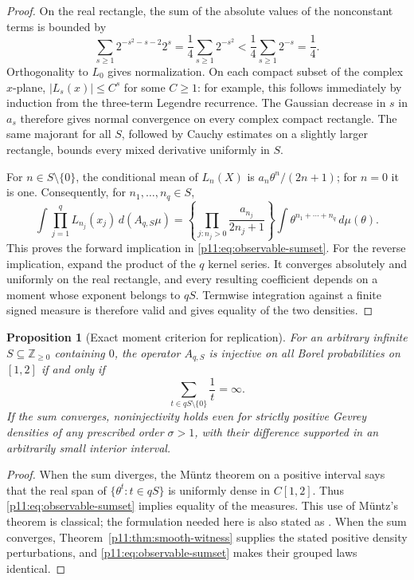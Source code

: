 \documentclass[11pt,letterpaper]{article}
\newtheorem{proposition}[theorem]{Proposition}
\theoremstyle{definition}
\theoremstyle{remark}
\newcommand{\1}{\mathbf 1}
\begin{document}
\begin{proof}
On the real rectangle, the sum of the absolute values of the
nonconstant terms is bounded by
\[
 \sum_{s\geq1}2^{-s^2-s-2}2^s
 =\frac14\sum_{s\geq1}2^{-s^2}
 <\frac14\sum_{s\geq1}2^{-s}=\frac14.
\]
Orthogonality to $L_0$ gives normalization.  On each compact subset of
the complex $x$-plane, $|L_s(x)|\leq C^s$ for some $C\geq1$: for example,
this follows immediately by induction from the three-term Legendre
recurrence.  The Gaussian decrease in $s$ in $a_s$ therefore gives
normal convergence on every complex compact rectangle.  The same
majorant for all $S$, followed by Cauchy estimates on a slightly larger
rectangle, bounds every mixed derivative uniformly in $S$.

For $n\in S\setminus\{0\}$, the conditional mean of $L_n(X)$ is
$a_n\theta^n/(2n+1)$; for $n=0$ it is one.  Consequently, for
$n_1,\ldots,n_q\in S$,
\begin{equation}\label{p11:eq:interval-product-statistic}
 \int\prod_{j=1}^q L_{n_j}(x_j)\,d(A_{q,S}\mu)
 =\left\{\prod_{j:n_j>0}\frac{a_{n_j}}{2n_j+1}\right\}
   \int\theta^{n_1+\cdots+n_q}\,d\mu(\theta).
\end{equation}
This proves the forward implication in \eqref{p11:eq:observable-sumset}.
For the reverse implication, expand the product of the $q$ kernel
series.  It converges absolutely and uniformly on the real rectangle,
and every resulting coefficient depends on a moment whose exponent
belongs to $qS$.  Termwise integration against a finite signed measure
is therefore valid and gives equality of the two densities.
\end{proof}

\begin{proposition}[Exact moment criterion for replication]
\label{p11:prop:interval-muntz}
For an arbitrary infinite $S\subseteq\mathbb Z_{\geq0}$ containing
$0$, the operator $A_{q,S}$ is injective on all Borel probabilities
on $[1,2]$ if and only if
\begin{equation}\label{p11:eq:replication-muntz}
 \sum_{t\in qS\setminus\{0\}}\frac1t=\infty.
\end{equation}
If the sum converges, noninjectivity holds even for strictly positive
Gevrey densities of any prescribed order $\sigma>1$, with their
difference supported in an arbitrarily small interior interval.
\end{proposition}
\begin{proof}
When the sum diverges, the M\"untz theorem on a positive interval says
that the real span of $\{\theta^t:t\in qS\}$ is uniformly dense in
$C[1,2]$.  Thus \eqref{p11:eq:observable-sumset} implies equality of the
measures.  This use of M\"untz's theorem is classical; the formulation
needed here is also stated as
\cite[Theorem~2]{BurginEpperleinWirth2022}.
When the sum converges, Theorem~\ref{p11:thm:smooth-witness} supplies the
stated positive density perturbations, and
\eqref{p11:eq:observable-sumset} makes their grouped laws identical.
\end{proof}
\end{document}
